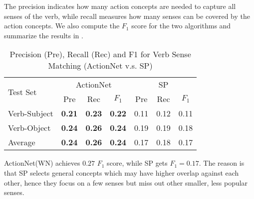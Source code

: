 The precision indicates how many action concepts are needed to
capture all senses of the verb, while recall measures how many
senses can be covered by the action concepts.
We also compute the $F_1$ score for the two algorithms and summarize the results
in .
\begin{table}[th]
\centering
\scriptsize
\caption{Precision (Pre), Recall (Rec) and F1 for Verb Sense Matching (ActionNet v.s. SP)}
\begin{tabular}{|l|c|c|c|c|c|c|}
\hline
\multirow{2}{*}{Test Set} & \multicolumn{3}{c|}{ActionNet} & \multicolumn{3}{c|}{SP}\\
\cline{2-7}
& Pre & Rec & $F_1$ & Pre & Rec & $F_1$\\
\hline
Verb-Subject &\bf 0.21 &\bf 0.23 &\bf 0.22 & 0.11 & 0.12 & 0.11\\
\hline
Verb-Object &\bf 0.24 &\bf 0.26 &\bf 0.24 & 0.19 & 0.19 & 0.18\\
\hline
Average &\bf 0.24 &\bf 0.26 &\bf 0.24 & 0.17 & 0.18 & 0.17\\
\hline
\end{tabular}
\label{tab:verbmatch}
\end{table}

ActionNet(WN) achieves $0.27$ $F_1$ score, while SP gets $F_1=0.17$.
The reason is that SP selects general
concepts which may have higher overlap against each other,
hence they focus on a few senses but miss out other smaller, 
less popular senses.
